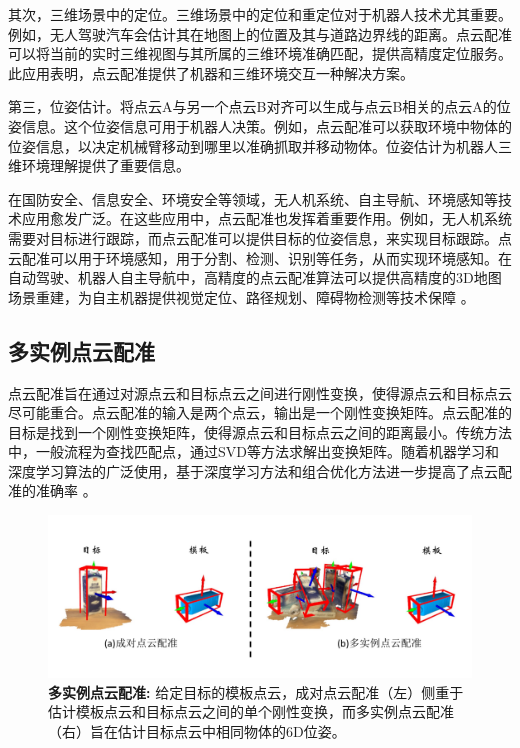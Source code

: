 其次，三维场景中的定位。三维场景中的定位和重定位对于机器人技术尤其重要。例如，无人驾驶汽车会估计其在地图上的位置及其与道路边界线的距离。点云配准可以将当前的实时三维视图与其所属的三维环境准确匹配，提供高精度定位服务。此应用表明，点云配准提供了机器和三维环境交互一种解决方案。

第三，位姿估计。将点云A与另一个点云B对齐可以生成与点云B相关的点云A的位姿信息。这个位姿信息可用于机器人决策。例如，点云配准可以获取环境中物体的位姿信息，以决定机械臂移动到哪里以准确抓取并移动物体。位姿估计为机器人三维环境理解提供了重要信息。

在国防安全、信息安全、环境安全等领域，无人机系统、自主导航、环境感知等技术应用愈发广泛。在这些应用中，点云配准也发挥着重要作用。例如，无人机系统需要对目标进行跟踪，而点云配准可以提供目标的位姿信息，来实现目标跟踪。点云配准可以用于环境感知，用于分割、检测、识别等任务，从而实现环境感知。在自动驾驶、机器人自主导航中，高精度的点云配准算法可以提供高精度的3D地图场景重建，为自主机器提供视觉定位、路径规划、障碍物检测等技术保障\cite{zidongjiashilujingguihua} 。


\subsection{多实例点云配准}
点云配准旨在通过对源点云和目标点云之间进行刚性变换，使得源点云和目标点云尽可能重合。点云配准的输入是两个点云，输出是一个刚性变换矩阵。点云配准的目标是找到一个刚性变换矩阵，使得源点云和目标点云之间的距离最小。传统方法中，一般流程为查找匹配点，通过SVD等方法求解出变换矩阵。随着机器学习和深度学习算法的广泛使用，基于深度学习方法和组合优化方法进一步提高了点云配准的准确率\cite{deng2018ppf,deng2018ppfnet,qin2022geometric} 。

\begin{figure}[ht]
    \vspace{-4mm}
    \includegraphics[width=\textwidth]{images/teaser.pdf}
    \caption{\textbf{多实例点云配准: } 给定目标的模板点云，成对点云配准（左）侧重于估计模板点云和目标点云之间的单个刚性变换，而多实例点云配准（右）旨在估计目标点云中相同物体的6D位姿。
    }
    \label{fig:teaser}
    \vspace{-10mm}
\end{figure}

